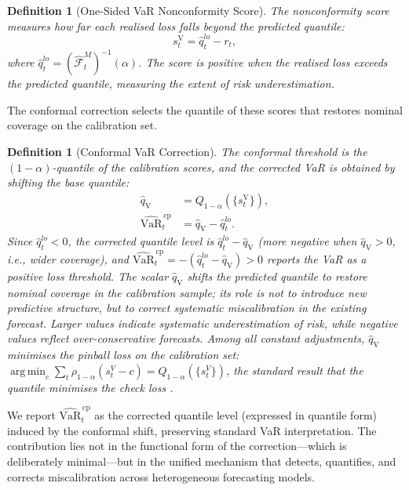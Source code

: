 \documentclass[preprint,11pt,authoryear]{elsarticle}
\DeclareMathOperator*{\argmin}{arg\,min}
\newtheorem{definition}[theorem]{Definition}
\newcommand{\VaR}{\mathrm{VaR}}
\newcommand{\1}{\boldsymbol{1}}
\newcommand{\qV}{\hat{q}_{\scriptscriptstyle\mathrm{V}}}
\newcommand{\Fhat}{\hat{\mathcal{F}}}
\begin{document}
	\begin{definition}[One-Sided VaR Nonconformity Score]
		\label{def:var_score}
		The nonconformity score measures how far each realised
		loss falls beyond the predicted quantile:
		\begin{equation}
			s_t^{\mathrm{V}} = \hat{q}_t^{lo} - r_t,
		\end{equation}
		where $\hat{q}_t^{lo} = (\Fhat_t^M)^{-1}(\alpha)$. The
		score is positive when the realised loss exceeds the
		predicted quantile, measuring the extent of risk
		underestimation.
	\end{definition}
	
	The conformal correction selects the quantile of these scores
	that restores nominal coverage on the calibration set.
	
	\begin{definition}[Conformal VaR Correction]
		\label{def:var_correction}
		The conformal threshold is the $(1-\alpha)$-quantile of
		the calibration scores, and the corrected VaR is obtained
		by shifting the base quantile:
		\begin{align}
			\qV &= Q_{1-\alpha}(\{s_t^{\mathrm{V}}\}), \\
			\widehat{\VaR}_t^{\,\mathrm{cp}}
			&= \qV - \hat{q}_t^{lo}.
		\end{align}
		Since $\hat{q}_t^{lo} < 0$, the corrected quantile level is $\hat{q}_t^{lo} - \qV$ (more negative when $\qV > 0$, i.e., wider coverage), and $\widehat{\VaR}_t^{\,\mathrm{cp}} = -(\hat{q}_t^{lo} - \qV) > 0$ reports the VaR as a positive loss threshold.
		The scalar $\qV$ shifts the predicted quantile to restore
		nominal coverage in the calibration sample; its role is not to introduce new predictive structure, but to correct systematic miscalibration in the existing forecast. Larger values indicate systematic
		underestimation of risk, while negative values reflect
		over-conservative forecasts. Among all constant
		adjustments, $\qV$ minimises the pinball loss on the
		calibration set: $\argmin_c \sum_t
		\rho_{1-\alpha}(s_t^V - c) = Q_{1-\alpha}(\{s_t^V\})$,
		the standard result that the quantile minimises the check
		loss \citep[Theorem~1.1]{koenker2005quantile}.
	\end{definition}

	We report $\widehat{\VaR}_t^{\,\mathrm{cp}}$ as the corrected quantile level (expressed in quantile form) induced by the conformal shift, preserving standard VaR interpretation.
	The contribution lies not in the functional form of the correction---which is deliberately minimal---but in the unified mechanism that detects, quantifies, and corrects miscalibration across heterogeneous forecasting models.
\end{document}
